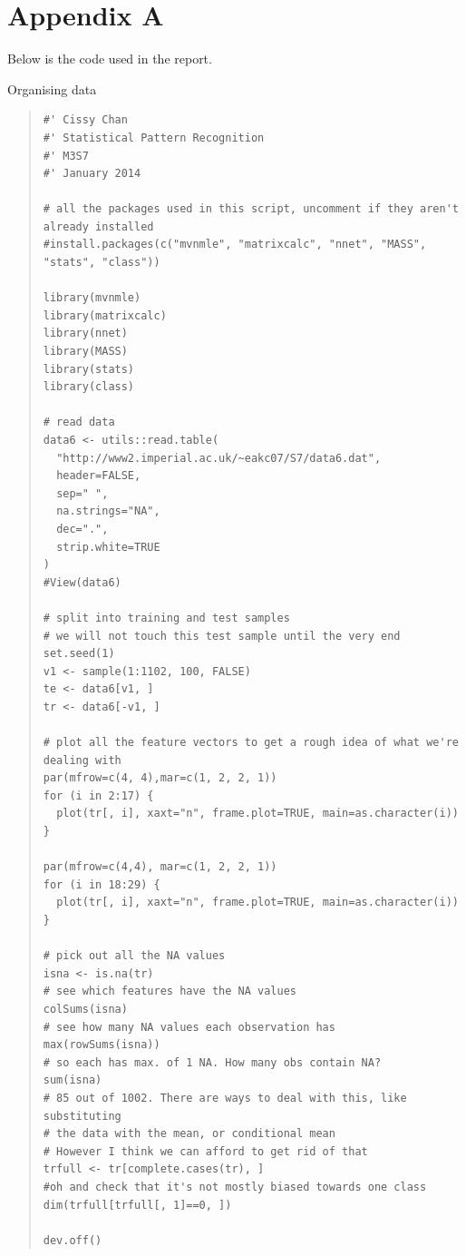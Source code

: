 \documentclass[11pt, a4paper]{article}
\begin{document}
\newpage
\section{Appendix A}

Below is the code used in the report.

Organising data
\begin{quote}
\begin{verbatim}
#' Cissy Chan
#' Statistical Pattern Recognition
#' M3S7
#' January 2014 

# all the packages used in this script, uncomment if they aren't already installed
#install.packages(c("mvnmle", "matrixcalc", "nnet", "MASS", "stats", "class"))

library(mvnmle)
library(matrixcalc)
library(nnet)
library(MASS)
library(stats)
library(class)

# read data
data6 <- utils::read.table(
  "http://www2.imperial.ac.uk/~eakc07/S7/data6.dat",
  header=FALSE,
  sep=" ",
  na.strings="NA",
  dec=".",
  strip.white=TRUE
)
#View(data6)

# split into training and test samples
# we will not touch this test sample until the very end
set.seed(1)
v1 <- sample(1:1102, 100, FALSE)
te <- data6[v1, ]
tr <- data6[-v1, ]

# plot all the feature vectors to get a rough idea of what we're dealing with
par(mfrow=c(4, 4),mar=c(1, 2, 2, 1))
for (i in 2:17) {
  plot(tr[, i], xaxt="n", frame.plot=TRUE, main=as.character(i))
}

par(mfrow=c(4,4), mar=c(1, 2, 2, 1))
for (i in 18:29) {
  plot(tr[, i], xaxt="n", frame.plot=TRUE, main=as.character(i))
}

# pick out all the NA values
isna <- is.na(tr)
# see which features have the NA values
colSums(isna)
# see how many NA values each observation has
max(rowSums(isna))
# so each has max. of 1 NA. How many obs contain NA?
sum(isna)
# 85 out of 1002. There are ways to deal with this, like substituting 
# the data with the mean, or conditional mean
# However I think we can afford to get rid of that
trfull <- tr[complete.cases(tr), ]
#oh and check that it's not mostly biased towards one class
dim(trfull[trfull[, 1]==0, ])

dev.off()
\end{verbatim}
\end{quote}
\end{document}
